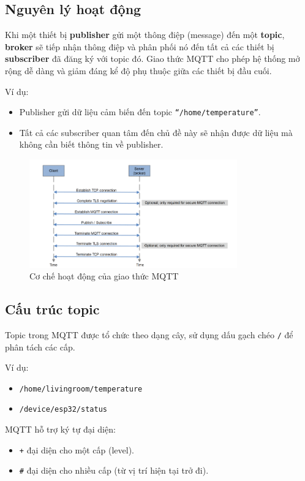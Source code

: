 \subsection{Nguyên lý hoạt động}

Khi một thiết bị \textbf{publisher} gửi một thông điệp (message) đến một \textbf{topic}, \textbf{broker} sẽ tiếp nhận thông điệp và phân phối nó đến tất cả các thiết bị \textbf{subscriber} đã đăng ký với topic đó. Giao thức MQTT cho phép hệ thống mở rộng dễ dàng và giảm đáng kể độ phụ thuộc giữa các thiết bị đầu cuối.

Ví dụ:
\begin{itemize}
    \item Publisher gửi dữ liệu cảm biến đến topic \texttt{``/home/temperature''}.
    \item Tất cả các subscriber quan tâm đến chủ đề này sẽ nhận được dữ liệu mà không cần biết thông tin về publisher.
\end{itemize}
\begin{figure}[H]
  \centering
  \includegraphics[width=0.8\textwidth]{Images/mqtt-data-1.png}
  \caption{Cơ chế hoạt động của giao thức MQTT}
\end{figure}
\subsection{Cấu trúc topic}

Topic trong MQTT được tổ chức theo dạng cây, sử dụng dấu gạch chéo \texttt{/} để phân tách các cấp.

Ví dụ:
\begin{itemize}
    \item \texttt{/home/livingroom/temperature}
    \item \texttt{/device/esp32/status}
\end{itemize}

MQTT hỗ trợ ký tự đại diện:
\begin{itemize}
    \item \texttt{+} đại diện cho một cấp (level).
    \item \texttt{\#} đại diện cho nhiều cấp (từ vị trí hiện tại trở đi).
\end{itemize}

